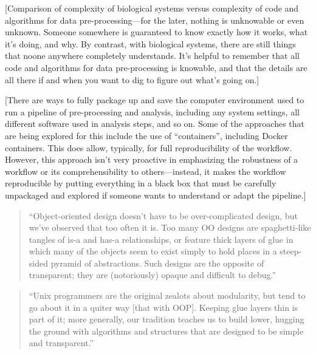 \documentclass[]{tufte-book}
\begin{document}
{[}Comparison of complexity of biological systems versus complexity of code and
algorithms for data pre-processing---for the later, nothing is unknowable or even
unknown. Someone somewhere is guaranteed to know exactly how it works, what it's
doing, and why. By contrast, with biological systems, there are still things
that noone anywhere completely understands. It's helpful to remember that all
code and algorithms for data pre-processing is knowable, and that the details
are all there if and when you want to dig to figure out what's going on.{]}

{[}There are ways to fully package up and save the computer environment used to
run a pipeline of pre-processing and analysis, including any system settings,
all different software used in analysis steps, and so on. Some of the approaches
that are being explored for this include the use of ``containers'', including
Docker containers. This does allow, typically, for full reproducibility of
the workflow. However, this approach isn't very proactive in emphasizing the
robustness of a workflow or its comprehensibility to others---instead, it
makes the workflow reproducible by putting everything in a black box that must
be carefully unpackaged and explored if someone wants to understand or adapt
the pipeline.{]}

\begin{quote}
``Object-oriented design doesn't have to be over-complicated design, but we've
observed that too often it is. Too many OO designs are spaghetti-like tangles of
is-a and has-a relationships, or feature thick layers of glue in which many of the
objects seem to exist simply to hold places in a steep-sided pyramid of abstractions.
Such designs are the opposite of transparent; they are (notoriously) opaque and
difficult to debug.'' \citep{raymond2003art}
\end{quote}

\begin{quote}
``Unix programmers are the original zealots about modularity, but tend to go about it
in a quiter way {[}that with OOP{]}. Keeping glue layers thin is part of it; more generally,
our tradition teaches us to build lower, hugging the ground with algorithms and structures
that are designed to be simple and transparent.'' \citep{raymond2003art}
\end{quote}
\end{document}
